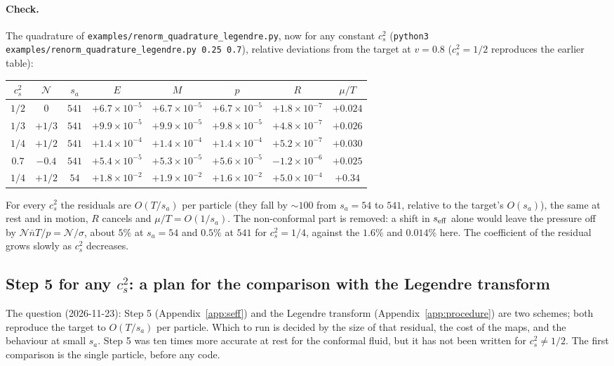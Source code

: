 \documentclass[11pt,aps,preprint,nofootinbib,superscriptaddress,tightenlines]{revtex4-2}
\def\App#1{Appendix~\ref{#1}}
\let\oldparagraph\paragraph
\renewcommand{\paragraph}{\par\bigskip\oldparagraph}
\begin{document}
\paragraph{Check.}  The quadrature of \nolinkurl{examples/renorm_quadrature_legendre.py}, now for any constant $c_s^2$ (\texttt{python3 examples/renorm\_quadrature\_legendre.py 0.25 0.7}),
relative deviations from the target at $v=0.8$ ($c_s^2=1/2$ reproduces the earlier table):
\begin{center}
\small
\begin{tabular}{cccccccc}
\toprule
$c_s^2$ & $\mathcal N$ & $s_a$ & $E$ & $M$ & $p$ & $R$ & $\mu/T$ \\
\midrule
$1/2$ & $0$ & $541$ & $+6.7\times10^{-5}$ & $+6.7\times10^{-5}$ & $+6.7\times10^{-5}$ & $+1.8\times10^{-7}$ & $+0.024$ \\
$1/3$ & $+1/3$ & $541$ & $+9.9\times10^{-5}$ & $+9.9\times10^{-5}$ & $+9.8\times10^{-5}$ & $+4.8\times10^{-7}$ & $+0.026$ \\
$1/4$ & $+1/2$ & $541$ & $+1.4\times10^{-4}$ & $+1.4\times10^{-4}$ & $+1.4\times10^{-4}$ & $+5.2\times10^{-7}$ & $+0.030$ \\
$0.7$ & $-0.4$ & $541$ & $+5.4\times10^{-5}$ & $+5.3\times10^{-5}$ & $+5.6\times10^{-5}$ & $-1.2\times10^{-6}$ & $+0.025$ \\
\midrule
$1/4$ & $+1/2$ & $54$ & $+1.8\times10^{-2}$ & $+1.9\times10^{-2}$ & $+1.6\times10^{-2}$ & $+5.0\times10^{-4}$ & $+0.34$ \\
\bottomrule
\end{tabular}
\end{center}
For every $c_s^2$ the residuals are $O(T/s_a)$ per particle (they fall by $\sim100$ from $s_a=54$ to $541$, relative to the target's $O(s_a)$), the same at rest and in
motion, $R$ cancels and $\mu/T=O(1/s_a)$.  The non-conformal part is removed: a shift in $s_{\rm eff}$ alone would leave the pressure off by $\mathcal N\bar nT/p=\mathcal N/\sigma$,
about $5\%$ at $s_a=54$ and $0.5\%$ at $541$ for $c_s^2=1/4$, against the $1.6\%$ and $0.014\%$ here.  The coefficient of the residual grows slowly as $c_s^2$
decreases.

\subsection{Step 5 for any \texorpdfstring{$c_s^2$}{cs2}: a plan for the comparison with the Legendre transform}
\label{app:step5plan}

The question (2026-11-23): Step 5 (\App{app:seff}) and the Legendre transform (\App{app:procedure}) are two schemes; both reproduce the target to $O(T/s_a)$ per
particle.  Which to run is decided by the size of that residual, the cost of the maps, and the behaviour at small $s_a$.  Step 5 was ten times more accurate at rest
for the conformal fluid, but it has not been written for $c_s^2\neq1/2$.  The first comparison is the single particle, before any code.
\end{document}

